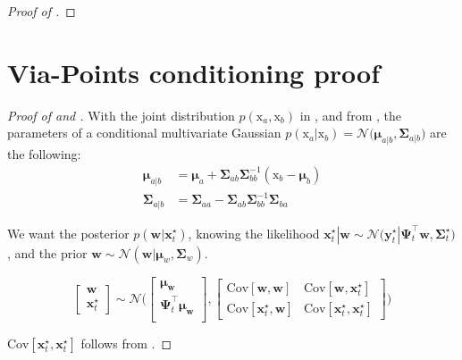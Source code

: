 \documentclass{article}
\begin{document}
\begin{proof}[Proof of ]
\end{proof}

\section{Via-Points conditioning proof}

\begin{proof}[Proof of  and ]\label{proof:conditioning}
  With the joint distribution $p(\bm{\mathrm{x}}_{a}, \bm{\mathrm{x}}_{b})$ in , and from \citep{bishop2024learning}, the parameters of a conditional multivariate Gaussian $p(\bm{\mathrm{x}}_{a}|\bm{\mathrm{x}}_{b}) = \mathcal{N}\big( \bm{\mu}_{a|b}, \bm{\Sigma}_{a|b} \big)$ are the following:
\begin{align}
  \bm{\mu}_{a|b} &= \bm{\mu}_{a} + \bm{\Sigma}_{ab}\bm{\Sigma}_{bb}^{-1}(\bm{\mathrm{x}}_{b} - \bm{\mu}_{b})\label{eq:cond-multi-gauss-mu}\\
  \bm{\Sigma}_{a|b} &= \bm{\Sigma}_{aa} - \bm{\Sigma}_{ab}\bm{\Sigma}_{bb}^{-1}\bm{\Sigma}_{ba}\label{eq:cond-multi-gauss-sigma}
\end{align}

We want the posterior $p(\bm{w}|\bm{x}_t^\star)$, knowing the likelihood $\bm{x}_t^\star|\bm{w} \sim \mathcal{N}\Big( \bm{y}_t^\star | \bm{\Psi}_t^\top\bm{w}, \bm{\Sigma}^\star_t \Big)$, and the prior $\bm{w} \sim \mathcal{N}(\bm{w}|\bm{\mu}_{w}, \bm{\Sigma}_{w})$.

\begin{equation}
  \begin{bmatrix}
    \bm{w} \\
    \bm{x}_t^{\star}
  \end{bmatrix} \sim \mathcal{N}\Bigg(
  \begin{bmatrix}
    \bm{\mu_w} \\
    \bm{\Psi}^\top_t \bm{\mu_w}\\
  \end{bmatrix},
  \begin{bmatrix}
    \mathrm{Cov}[\bm{w}, \bm{w}] &  \mathrm{Cov}[\bm{w}, \bm{x}_t^{\star}] \\
    \mathrm{Cov}[\bm{x}_t^{\star}, \bm{w}] & \mathrm{Cov}[\bm{x}_t^{\star}, \bm{x}_t^{\star}]
  \end{bmatrix}
  \Bigg)
\end{equation}

$\mathrm{Cov}[\bm{x}_t^{\star}, \bm{x}_t^{\star}]$ follows from .


\end{proof}
\end{document}
